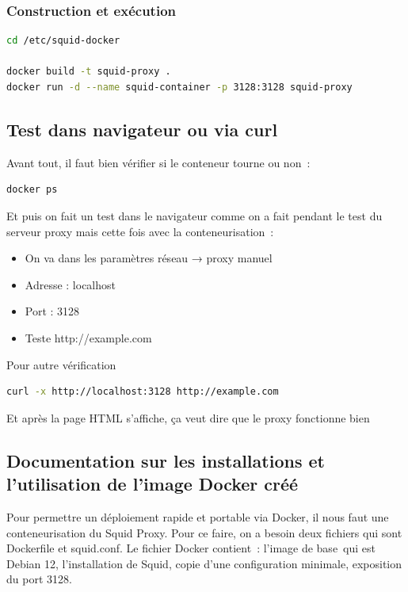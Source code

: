 \documentclass[12pt,a4paper]{article}
\begin{document}
\subsubsection{Construction et exécution}
\begin{lstlisting}[language=bash]
cd /etc/squid-docker

docker build -t squid-proxy .
docker run -d --name squid-container -p 3128:3128 squid-proxy
\end{lstlisting}
\subsection{Test dans navigateur ou via curl}
Avant tout, il faut bien vérifier si le conteneur tourne ou non :

\begin{lstlisting}[language=bash]
docker ps
\end{lstlisting}
Et puis on fait un test dans le navigateur comme on a fait pendant le test du serveur proxy mais cette fois avec la conteneurisation :

\begin{itemize}
    \item On va dans les paramètres réseau → proxy manuel
\end{itemize}
\begin{itemize}
    \item Adresse : localhost
\end{itemize}
\begin{itemize}
    \item Port : 3128
\end{itemize}
\begin{itemize}
    \item Teste http://example.com
\end{itemize}

Pour autre vérification
\begin{lstlisting}[language=bash]
curl -x http://localhost:3128 http://example.com
\end{lstlisting}
Et après la page HTML s’affiche, ça veut dire que le proxy fonctionne bien
\subsection{Documentation sur les installations et l’utilisation de l’image Docker créé}
Pour permettre un déploiement rapide et portable via Docker, il nous faut une conteneurisation du Squid Proxy. Pour ce faire, on a besoin deux fichiers qui sont Dockerfile et squid.conf. Le fichier Docker contient : l’image de base qui est Debian 12, l’installation de Squid, copie d’une configuration minimale, exposition du port 3128.
\end{document}
